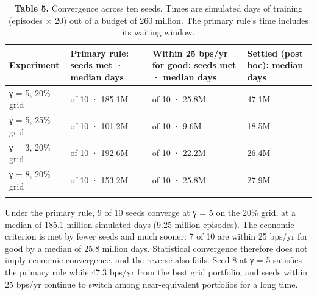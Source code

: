 \documentclass[
  11pt]{article}
\begin{document}
\begin{table}[htbp]
\centering\small
\caption{\textbf{Table 5.} Convergence across ten seeds. Times are
simulated days of training (episodes × 20) out of a budget of 260
million. The primary rule's time includes its waiting
window.}
\begin{tabular}{@{}
  >{\raggedright\arraybackslash}p{}
  >{\raggedright\arraybackslash}p{}
  >{\raggedright\arraybackslash}p{}
  >{\raggedright\arraybackslash}p{}@{}}
\toprule\noalign{}
\begin{minipage}[b]{\linewidth}\raggedright
Experiment
\end{minipage} & \begin{minipage}[b]{\linewidth}\raggedright
Primary rule: seeds met · median days
\end{minipage} & \begin{minipage}[b]{\linewidth}\raggedright
Within 25 bps/yr for good: seeds met · median days
\end{minipage} & \begin{minipage}[b]{\linewidth}\raggedright
Settled (post hoc): median days
\end{minipage} \\
\midrule\noalign{}
γ = 5, 20\% grid & 9 of 10 · 185.1M & 7 of 10 · 25.8M & 47.1M \\
γ = 5, 25\% grid & 10 of 10 · 101.2M & 9 of 10 · 9.6M & 18.5M \\
γ = 3, 20\% grid & 8 of 10 · 192.6M & 6 of 10 · 22.2M & 26.4M \\
γ = 8, 20\% grid & 9 of 10 · 153.2M & 7 of 10 · 25.8M & 27.9M \\
\bottomrule\noalign{}
\end{tabular}
\end{table}

Under the primary rule, 9 of 10 seeds converge at γ = 5 on the 20\%
grid, at a median of 185.1 million simulated days (9.25 million
episodes). The economic criterion is met by fewer seeds and much sooner:
7 of 10 are within 25 bps/yr for good by a median of 25.8 million days.
Statistical convergence therefore does not imply economic convergence,
and the reverse also fails. Seed 8 at γ = 5 satisfies the primary rule
while 47.3 bps/yr from the best grid portfolio, and seeds within 25
bps/yr continue to switch among near-equivalent portfolios for a long
time.
\end{document}
